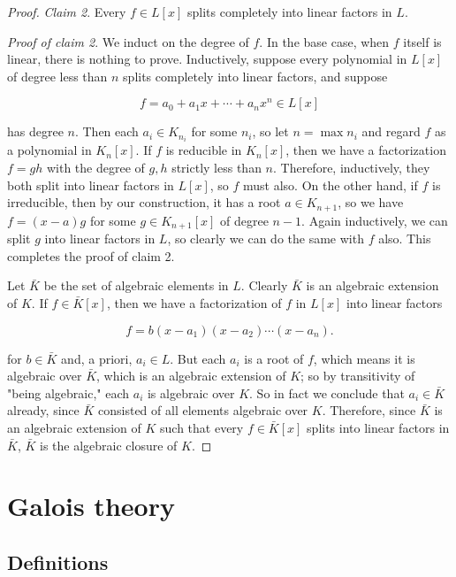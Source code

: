\begin{proof}
\emph{Claim 2}. Every $ f \in L[x]$ splits completely into linear factors in $ L$.

\emph{Proof of claim 2}. We induct on the degree of $ f$. In the base case, when $ f$ itself is linear, there is nothing to prove. Inductively, suppose every polynomial in $ L[x]$ of degree less than $ n$ splits completely into linear factors, and suppose

\[ f = a_0 + a_1x + \dotsb + a_nx^n \in L[x] \]

has degree $ n$. Then each $ a_i \in K_{n_i}$ for some $ n_i$, so let $ n = \max n_i$ and regard $ f$ as a polynomial in $ K_n[x]$. If $ f$ is reducible in $ K_n[x]$, then we have a factorization $ f = gh$ with the degree of $ g, h$ strictly less than $ n$. Therefore, inductively, they both split into linear factors in $ L[x]$, so $ f$ must also. On the other hand, if $ f$ is irreducible, then by our construction, it has a root $ a\in K_{n+1}$, so we have $ f = (x - a) g$ for some $ g \in K_{n+1}[x]$ of degree $ n - 1$. Again inductively, we can split $ g$ into linear factors in $ L$, so clearly we can do the same with $ f$ also. This completes the proof of claim 2.

Let $ \bar{K}$ be the set of algebraic elements in $ L$. Clearly $ \bar{K}$ is an algebraic extension of $ K$. If $ f \in \bar{K}[x]$, then we have a factorization of $ f$ in $ L[x]$ into linear factors

\[ f = b(x - a_1)(x - a_2) \dotsb (x - a_n). \]

for $ b \in \bar{K}$ and, a priori, $ a_i \in L$. But each $ a_i$ is a root of $ f$, which means it is algebraic over $ \bar{K}$, which is an algebraic extension of $ K$; so by transitivity of "being algebraic," each $ a_i$ is algebraic over $ K$. So in fact we conclude that $ a_i \in \bar{K}$ already, since $ \bar{K}$ consisted of all elements algebraic over $ K$. Therefore, since $ \bar{K}$ is an algebraic extension of $ K$ such that every $ f \in \bar{K}[x]$ splits into linear factors in $ \bar{K}$, $ \bar{K}$ is the algebraic closure of $ K$.

\end{proof}

\section{Galois theory}
\subsection{Definitions}

